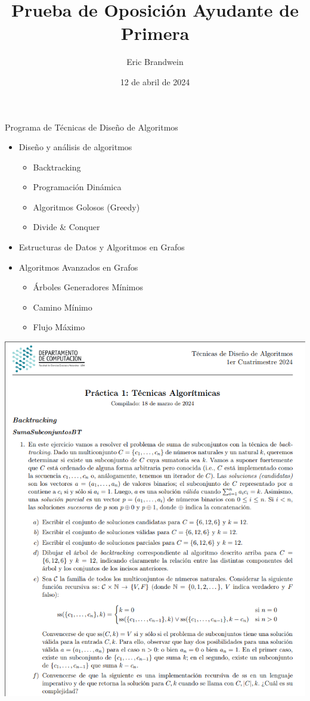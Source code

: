 \documentclass{beamer}
\title{Prueba de Oposición Ayudante de Primera}
\author{Eric Brandwein}
\date{12 de abril de 2024}
\begin{document}
\begin{frame}
  \titlepage
\end{frame}

\begin{frame}{Programa de Técnicas de Diseño de Algoritmos}
    \begin{itemize}
        \item<1-2> Diseño y análisis de algoritmos
        \begin{itemize}
            \item<1-2> Backtracking
            \item<1-2> Programación Dinámica
            \item<1-2> Algoritmos Golosos (Greedy)
            \item<-1> Divide \& Conquer
        \end{itemize}
        \item<-1> Estructuras de Datos y Algoritmos en Grafos
        \item<-1> Algoritmos Avanzados en Grafos
        \begin{itemize}
            \item Árboles Generadores Mínimos
            \item Camino Mínimo
            \item Flujo Máximo
        \end{itemize}
    \end{itemize}
\end{frame}

\begin{frame}
    \includegraphics[trim={1mm 0 0 1mm}, clip, width=\textwidth]{img/titulo-guia.png}
\end{frame}
\end{document}
